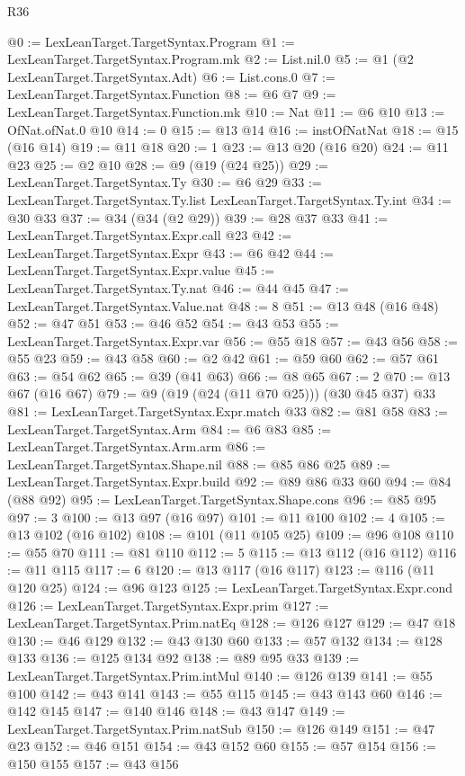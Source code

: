 \begin{lexlean}{R36}
\begin{coremodule}
{{{{{{{{@0 := LexLeanTarget.TargetSyntax.Program
@1 := LexLeanTarget.TargetSyntax.Program.mk
@2 := List.nil.{0}
@5 := @1 (@2 LexLeanTarget.TargetSyntax.Adt)
@6 := List.cons.{0}
@7 := LexLeanTarget.TargetSyntax.Function
@8 := @6 @7
@9 := LexLeanTarget.TargetSyntax.Function.mk
@10 := Nat
@11 := @6 @10
@13 := OfNat.ofNat.{0} @10
@14 := 0
@15 := @13 @14
@16 := instOfNatNat
@18 := @15 (@16 @14)
@19 := @11 @18
@20 := 1
@23 := @13 @20 (@16 @20)
@24 := @11 @23
@25 := @2 @10
@28 := @9 (@19 (@24 @25))
@29 := LexLeanTarget.TargetSyntax.Ty
@30 := @6 @29
@33 := LexLeanTarget.TargetSyntax.Ty.list LexLeanTarget.TargetSyntax.Ty.int
@34 := @30 @33
@37 := @34 (@34 (@2 @29))
@39 := @28 @37 @33
@41 := LexLeanTarget.TargetSyntax.Expr.call @23
@42 := LexLeanTarget.TargetSyntax.Expr
@43 := @6 @42
@44 := LexLeanTarget.TargetSyntax.Expr.value
@45 := LexLeanTarget.TargetSyntax.Ty.nat
@46 := @44 @45
@47 := LexLeanTarget.TargetSyntax.Value.nat
@48 := 8
@51 := @13 @48 (@16 @48)
@52 := @47 @51
@53 := @46 @52
@54 := @43 @53
@55 := LexLeanTarget.TargetSyntax.Expr.var
@56 := @55 @18
@57 := @43 @56
@58 := @55 @23
@59 := @43 @58
@60 := @2 @42
@61 := @59 @60
@62 := @57 @61
@63 := @54 @62
@65 := @39 (@41 @63)
@66 := @8 @65
@67 := 2
@70 := @13 @67 (@16 @67)
@79 := @9 (@19 (@24 (@11 @70 @25))) (@30 @45 @37) @33
@81 := LexLeanTarget.TargetSyntax.Expr.match @33
@82 := @81 @58
@83 := LexLeanTarget.TargetSyntax.Arm
@84 := @6 @83
@85 := LexLeanTarget.TargetSyntax.Arm.arm
@86 := LexLeanTarget.TargetSyntax.Shape.nil
@88 := @85 @86 @25
@89 := LexLeanTarget.TargetSyntax.Expr.build
@92 := @89 @86 @33 @60
@94 := @84 (@88 @92)
@95 := LexLeanTarget.TargetSyntax.Shape.cons
@96 := @85 @95
@97 := 3
@100 := @13 @97 (@16 @97)
@101 := @11 @100
@102 := 4
@105 := @13 @102 (@16 @102)
@108 := @101 (@11 @105 @25)
@109 := @96 @108
@110 := @55 @70
@111 := @81 @110
@112 := 5
@115 := @13 @112 (@16 @112)
@116 := @11 @115
@117 := 6
@120 := @13 @117 (@16 @117)
@123 := @116 (@11 @120 @25)
@124 := @96 @123
@125 := LexLeanTarget.TargetSyntax.Expr.cond
@126 := LexLeanTarget.TargetSyntax.Expr.prim
@127 := LexLeanTarget.TargetSyntax.Prim.natEq
@128 := @126 @127
@129 := @47 @18
@130 := @46 @129
@132 := @43 @130 @60
@133 := @57 @132
@134 := @128 @133
@136 := @125 @134 @92
@138 := @89 @95 @33
@139 := LexLeanTarget.TargetSyntax.Prim.intMul
@140 := @126 @139
@141 := @55 @100
@142 := @43 @141
@143 := @55 @115
@145 := @43 @143 @60
@146 := @142 @145
@147 := @140 @146
@148 := @43 @147
@149 := LexLeanTarget.TargetSyntax.Prim.natSub
@150 := @126 @149
@151 := @47 @23
@152 := @46 @151
@154 := @43 @152 @60
@155 := @57 @154
@156 := @150 @155
@157 := @43 @156
}}}}}}}}
\end{coremodule}
\end{lexlean}
